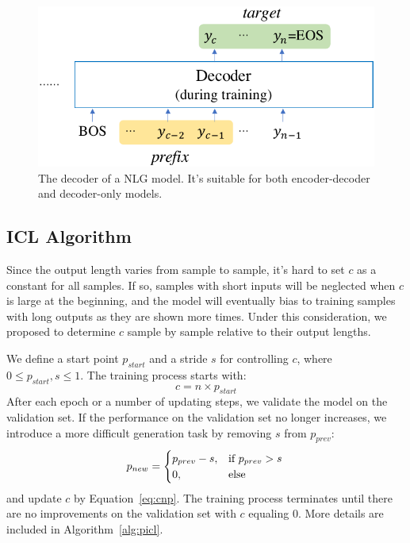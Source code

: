  
 \begin{figure}[th]
 	\centering
 	\includegraphics[scale=0.45]{decoder.pdf}
 	\caption{The decoder of a NLG model. It's suitable for both encoder-decoder and decoder-only models.} 
 	\label{fig:decoder}
 \end{figure}
 
 
\subsection{ICL Algorithm}
\label{sec:iclalgorithm}
Since the output length varies from sample to sample, it's hard to set $c$ as a constant for all samples.
If so, samples with short inputs will be neglected when $c$ is large at the beginning, and the model will eventually bias to training samples with long outputs as they are shown more times.
Under this consideration, we proposed to determine $c$ sample by sample relative to their output lengths.

We define a start point $p_{start}$ and a stride $s$ for controlling $c$, where $0\leq p_{start}, s \leq 1$.
The training process starts with: 
\begin{equation}
	c = n\times p_{start}
	\label{eq:cnp}
\end{equation}
After each epoch or a number of updating steps, we validate the model on the validation set. If the performance on the validation set no longer increases, we introduce a more difficult generation task 
by removing $s$ from $p_{prev}$:
\begin{equation*}
	p_{new} = 
	\begin{cases}
	p_{prev}-s, & \text{if $p_{prev}>s$} \\
	0, & \text{else}
	\end{cases} \\
\end{equation*}
and update $c$ by Equation~\ref{eq:cnp}. The training process terminates until there are no improvements on the validation set with $c$ equaling 0.
More details are included in Algorithm~\ref{alg:picl}. %

